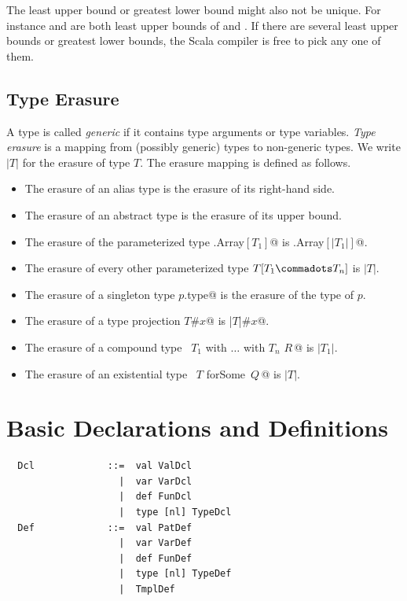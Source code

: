 The least upper bound or greatest lower bound might also not be
unique. For instance  and  are both
least upper bounds of  and . If there are several
least upper bounds or greatest lower bounds, the Scala compiler is
free to pick any one of them.

\section{Type Erasure}
\label{sec:erasure}

A type is called {\em generic} if it contains type arguments or type variables.
{\em Type erasure} is a mapping from (possibly generic) types to
non-generic types. We write $|T|$ for the erasure of type $T$.
The erasure mapping is defined as follows.
\begin{itemize}
\item The erasure of an alias type is the erasure of its right-hand side. %
\item The erasure of an abstract type is the erasure of its upper bound.
\item The erasure of the parameterized type \lstinline@scala.Array$[T_1]$@ is
 \lstinline@scala.Array$[|T_1|]$@.
 \item The erasure of every other parameterized type $T[T_1 \commadots T_n]$ is $|T|$.
\item The erasure of a singleton type \lstinline@$p$.type@ is the 
      erasure of the type of $p$.
\item The erasure of a type projection \lstinline@$T$#$x$@ is \lstinline@|$T$|#$x$@.
\item The erasure of a compound type ~\lstinline@$T_1$ with $\ldots$ with $T_n$ {$R\,$}@ 
      is $|T_1|$.
\item The erasure of an existential type ~\lstinline@$T$ forSome {$\,Q\,$}@ 
      is $|T|$.
\end{itemize}

\chapter{Basic Declarations and Definitions}
\label{sec:defs}

\syntax\begin{lstlisting}
  Dcl             ::=  val ValDcl
                    |  var VarDcl
                    |  def FunDcl
                    |  type [nl] TypeDcl
  Def             ::=  val PatDef 
                    |  var VarDef 
                    |  def FunDef 
                    |  type [nl] TypeDef 
                    |  TmplDef
\end{lstlisting}

